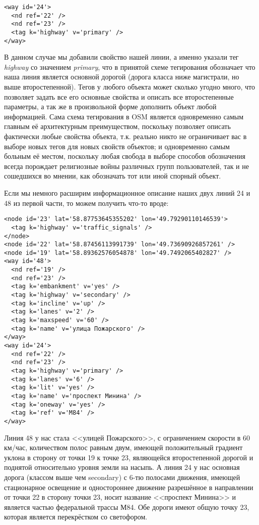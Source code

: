 \begin{verbatim}
<way id='24'>
  <nd ref='22' />
  <nd ref='23' />
  <tag k='highway' v='primary' />
</way>
\end{verbatim}

В данном случае мы добавили свойство нашей линии, а именно указали тег 
\emph{highway} со значением \emph{primary}, что в принятой схеме тегирования 
обозначает что наша линия является основной дорогой (дорога класса ниже 
магистрали, но выше второстепенной). Тегов у любого объекта может сколько 
угодно много, что позволяет задать все его основные свойства и описать все 
второстепенные параметры, а так же в произвольной форме дополнить объект любой 
информацией. Сама схема тегирования в OSM является одновременно самым главным 
её архитектурным преимуществом, поскольку позволяет описать фактически любые 
свойства объекта, т.к. реально никто не ограничивает вас в выборе новых тегов 
для новых свойств объектов; и одновременно самым больным её местом, поскольку 
любая свобода в выборе способов обозначения всегда порождает религиозные войны 
различных групп пользователей, так и не сошедшихся во мнении, как обозначать 
тот или иной спорный объект.

Если мы немного расширим информационное описание наших двух линий 24 и 48 из 
первой части, то можем получить что-то вроде:

\begin{verbatim}
<node id='23' lat='58.87753645355202' lon='49.79290110146539'>
  <tag k='highway' v='traffic_signals' />
</node>
<node id='22' lat='58.87456113991739' lon='49.73690926857261' />
<node id='19' lat='58.89362576054878' lon='49.7492065402827' />
<way id='48'>
  <nd ref='19' />
  <nd ref='23' />
  <tag k='embankment' v='yes' />
  <tag k='highway' v='secondary' />
  <tag k='incline' v='up' />
  <tag k='lanes' v='2' />
  <tag k='maxspeed' v='60' />
  <tag k='name' v='улица Пожарского' />
</way>
<way id='24'>
  <nd ref='22' />
  <nd ref='23' />
  <tag k='highway' v='primary' />
  <tag k='lanes' v='6' />
  <tag k='lit' v='yes' />
  <tag k='name' v='проспект Минина' />
  <tag k='oneway' v='yes' />
  <tag k='ref' v='М84' />
</way>
\end{verbatim}

Линия 48 у нас стала <<улицей Пожарского>>, с ограничением скорости в 
60 км/час, количеством полос равным двум, имеющей положительный градиент 
уклона в сторону от точки 19 к точке 23, являющейся второстепенной дорогой и 
поднятой относительно уровня земли на насыпь. А линия 24 у нас основная дорога 
(классом выше чем secondary) с 6-тю полосами движения, имеющей стационарное 
освещение и одностороннее движение разрешённое в направлении от точки 22 в 
сторону точки 23, носит название <<проспект Минина>> и является частью 
федеральной трассы М84. Обе дороги имеют общую точку 23, которая является 
перекрёстком со светофором. \cite{habrahabr02}

